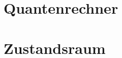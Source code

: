 \documentclass[11pt,oneside]{book}
\begin{document}
\part{Quantenrechner}






\part{Zustandsraum}




\appendix



\end{document}

